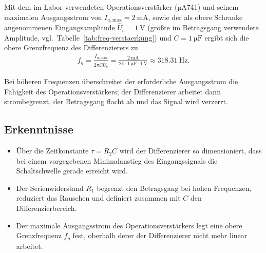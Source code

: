 Mit dem im Labor verwendeten Operationsverstärker (µA741) und seinem maximalen
Ausgangsstrom von
$I_{a,\mathrm{max}} = \SI{2}{\milli\ampere}$,
sowie der als obere Schranke angenommenen Eingangsamplitude
\(\hat{U}_e = \SI{1}{\volt}\)
(größte im Betragsgang verwendete Amplitude, vgl.\ Tabelle~\ref{tab:freq-verstaerkung})
und
$C = \SI{1}{\micro\farad}$
ergibt sich die obere Grenzfrequenz des Differenzierers zu
\begin{gather}
	f_g
	= \frac{I_{a,\mathrm{max}}}{2\pi C \hat{U}_e}
	= \frac{\SI{2}{\milli\ampere}}{2\pi \cdot \SI{1}{\micro\farad} \cdot \SI{1}{\volt}}
	\approx \SI{318.31}{\hertz}.
\end{gather}

Bei höheren Frequenzen überschreitet der erforderliche Ausgangsstrom die Fähigkeit des
Operationsverstärkers; der Differenzierer arbeitet dann strombegrenzt, der Betragsgang
flacht ab und das Signal wird verzerrt.

\subsection{Erkenntnisse}

\begin{itemize}
	\item Über die Zeitkonstante $\tau = R_2 C$ wird der Differenzierer so dimensioniert,
	      dass bei einem vorgegebenen Minimalanstieg des Eingangssignals die Schaltschwelle
	      gerade erreicht wird.
	\item Der Serienwiderstand $R_1$ begrenzt den Betragsgang bei hohen Frequenzen,
	      reduziert das Rauschen und definiert zusammen mit $C$ den Differenzierbereich.
	\item Der maximale Ausgangsstrom des Operationsverstärkers legt eine obere
	      Grenzfrequenz $f_g$ fest, oberhalb derer der Differenzierer nicht mehr linear
	      arbeitet.
\end{itemize}
